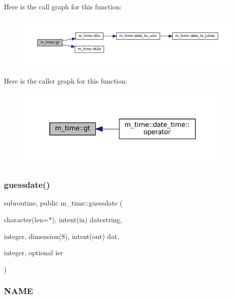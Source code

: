 Here is the call graph for this function\+:\nopagebreak
\begin{figure}[H]
\begin{center}
\leavevmode
\includegraphics[width=350pt]{namespacem__time_a62a48ba3b42ccf837b48584293231021_cgraph}
\end{center}
\end{figure}
Here is the caller graph for this function\+:\nopagebreak
\begin{figure}[H]
\begin{center}
\leavevmode
\includegraphics[width=302pt]{namespacem__time_a62a48ba3b42ccf837b48584293231021_icgraph}
\end{center}
\end{figure}
\mbox{\label{namespacem__time_aa5198c7aa4f3d8411c8ce93046ce3794}} 
\subsubsection{\texorpdfstring{guessdate()}{guessdate()}}
{\footnotesize\ttfamily subroutine, public m\+\_\+time\+::guessdate (\begin{DoxyParamCaption}\item[{character(len=$\ast$), intent(in)}]{datestring,  }\item[{integer, dimension(8), intent(out)}]{dat,  }\item[{integer, optional}]{ier }\end{DoxyParamCaption})}



\subsubsection*{N\+A\+ME}

